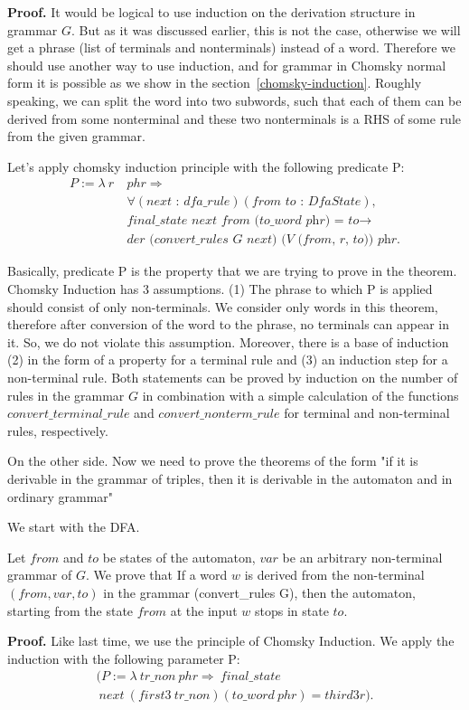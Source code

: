 \textbf{Proof.}
It would be logical to use induction on the derivation structure in grammar $G$. But as it was discussed earlier, this is not the case, otherwise we will get a phrase (list of terminals and nonterminals) instead of a word. Therefore we should use another way to use induction, and for grammar in Chomsky normal form it is possible as we show in the section~\ref{chomsky-induction}. Roughly speaking, we can split the word into two subwords, such that each of them can be derived from some nonterminal and these two nonterminals is a RHS of some rule from the given grammar.

Let's apply chomsky induction principle with the following predicate P:
\begin{align*}
  P :=  \lambda \ r \ & phr \Rightarrow \\
        &\forall (\textit{next : dfa\_rule}) (\textit{from to : DfaState}), \\
        &\textit{final\_state next from (to\_word phr) = to} \to \\
        &\textit{der (convert\_rules G next) (V (from, r, to)) phr}.
\end{align*}

Basically, predicate P is the property that we are trying to prove in the theorem. Chomsky Induction has 3 assumptions.
(1) The phrase to which P is applied should consist of only non-terminals. We consider only words in this theorem, therefore after conversion of the word to the phrase, no terminals can appear in it. So, we do not violate this assumption.
Moreover, there is a base of induction (2) in the form of a property for a terminal rule and (3) an induction step for a non-terminal rule.
Both statements can be proved by induction on the number of rules in the grammar $G$ in combination with a simple calculation of the functions $convert\_terminal\_rule$ and $convert\_nonterm\_rule$ for terminal and non-terminal rules, respectively.

On the other side. Now we need to prove the theorems of the form "if it is derivable in the grammar of triples, then it is derivable in the automaton and in ordinary grammar"

We start with the DFA.
\begin{theorem}
	Let $from$ and $to$ be states of the automaton, $var$ be an arbitrary non-terminal grammar of $G$. We prove that If a word $w$ is derived from the non-terminal $(from, var, to)$ in the grammar (convert\_rules G), then the automaton, starting from the state $from$ at the input $w$ stops in state $to$.
\end{theorem}
\textbf{Proof.} 
Like last time, we use the principle of Chomsky Induction.
We apply the induction with the following parameter P:
\begin{align*}
(P :=  \lambda \ tr\_non \ phr \Rightarrow \ final\_state \ \ \ \ \ \ \ \ \ \ \ \ \ \ \ \ \ \ \ \  \\ 
\ next \ (first3 \ tr\_non) (to\_word \ phr) = third3 r). 
\end{align*}

